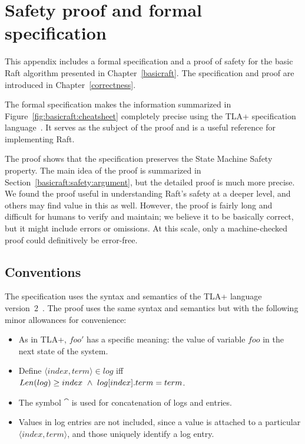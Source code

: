 \chapter{Safety proof and formal specification}
\label{appendix:correctness}

This appendix includes a formal specification and a proof of safety for
the basic Raft algorithm presented in Chapter~\ref{basicraft}. The
specification and proof are introduced in Chapter~\ref{correctness}.

The formal specification makes the information summarized in
Figure~\ref{fig:basicraft:cheatsheet} completely precise using the TLA+
specification language~\cite{Lamport:2002}. It serves as the subject of
the proof and is a useful reference for implementing Raft.

The proof shows that the specification preserves the State Machine
Safety property. The main idea of the proof is summarized in
Section~\ref{basicraft:safety:argument}, but the detailed proof is much
more precise. We found the proof useful in understanding Raft's safety
at a deeper level, and others may find value in this as well. However,
the proof is fairly long and difficult for humans to verify and
maintain; we believe it to be basically correct, but it might include
errors or omissions. At this scale, only a machine-checked proof could
definitively be error-free.

\section{Conventions}
The specification uses the syntax and semantics of the TLA+ language
version~2~\cite{Lamport:2002}.
The proof uses the same syntax and semantics but
with the following minor allowances for convenience:
\begin{itemize}
\item As in TLA+, $foo'$ has a specific meaning: the value of variable
$foo$ in the next state of the system.

\item Define $\langle index, term \rangle \in log$ iff \\
      $Len(log) \geq index \ \land\  log[index].term = term$.

\item The symbol $\cat$ is used for concatenation of logs and entries.

\item Values in log entries are not included, since a
value is attached to a particular $\langle index, term \rangle$, and
those uniquely identify a log entry.
\end{itemize}

